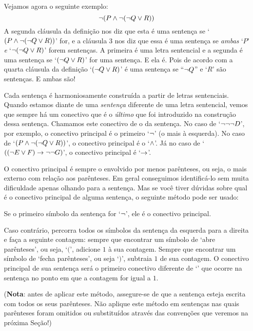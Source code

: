 Vejamos agora o seguinte exemplo:
$$\neg (P \wedge \neg (\neg Q \vee R))$$
A segunda cláusula da definição nos diz que esta é uma sentença se `$(P \wedge \neg (\neg Q \vee R))$' for, e a cláusula 3 nos diz que essa é uma sentença se \emph{ambas} `$P$' \emph{e} `$\neg (\neg Q \vee R)$' forem sentenças.
A primeira é uma letra sentencial e a segunda é uma sentença se `$(\neg Q \vee R)$' for uma sentença.
E ela é.
Pois de acordo com a quarta cláusula da definição `$(\neg Q \vee R)$' é uma sentença se ``$\neg Q$'' e `$R$' são sentenças. E ambas são!

Cada sentença é harmoniosamente construída a partir de letras sentenciais.
Quando estamos diante de uma \emph{sentença} diferente de uma letra sentencial, vemos que sempre há um conectivo que é o \emph{último} que foi introduzido na construção dessa sentença.
Chamamos este conectivo de o  da sentença.
No caso de `$\neg\neg\neg D$', por exemplo, o conectivo principal é o primeiro `$\neg$' (o mais à esquerda).
No caso de `$(P \wedge \neg (\neg Q \vee R))$', o conectivo principal é o `$\wedge$'.
Já no caso de `$((\neg E \vee F) \rightarrow \neg\neg G)$', o conectivo principal  é `$\rightarrow$'.

O conectivo principal é sempre o envolvido por menos parênteses, ou seja, o mais externo com relação aos parênteses.
Em geral conseguimos identificá-lo sem muita dificuldade apenas olhando para a sentença.
Mas se você tiver dúvidas sobre qual é o conectivo principal de alguma sentença, o seguinte método pode ser usado:
\begin{ebullet}
	\item Se o primeiro símbolo da sentença for `$\neg$', ele é o conectivo principal.
	\item  Caso contrário, percorra todos os símbolos da sentença da esquerda para a direita e faça a seguinte contagem: sempre que encontrar um símbolo de `abre parênteses', ou seja, `$($', adicione $1$ à sua contagem. Sempre que encontrar um símbolo de `fecha parênteses', ou seja `$)$', subtraia $1$ de sua contagem. O conectivo principal de sua sentença será o primeiro conectivo diferente de `\enot' que ocorre na sentença no ponto em que a contagem for igual a $1$.
\end{ebullet}

\noindent (\textbf{Nota}: antes de aplicar este método, assegure-se de que a sentença esteja escrita com todos os seus parênteses.
Não aplique este método em sentenças nas quais parênteses foram omitidos ou substituídos através das convenções que veremos na próxima Seção!)

